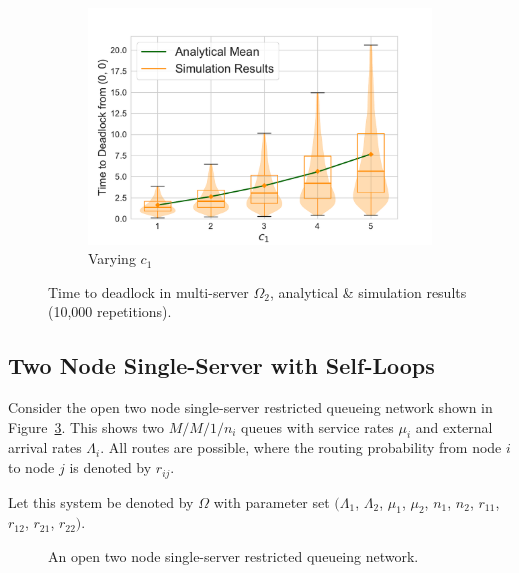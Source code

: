 \documentclass{article}
\numberwithin{equation}{section}
\begin{document}
\begin{figure}[!htbp]
\begin{center}
\begin{subfigure}[b]{0.48\textwidth}
    \includegraphics[width=\textwidth]{images/2Nms_varyc1}
    \caption{Varying $c_1$}
    \label{fig:2Nms_c}
  \end{subfigure}
  \end{center}
  \caption{Time to deadlock in multi-server $\Omega_2$, analytical \&
  simulation results (10,000 repetitions).}
  \label{fig:timestodeadlock2nodemultiserver}
\end{figure}


\subsection{Two Node Single-Server with Self-Loops}\label{sec:2nodeselfloops}

Consider the open two node single-server restricted queueing network shown in
Figure~\ref{fig:queueingnetwork_2nodesfeedback}.
This shows two \(M/M/1/n_i\) queues with service rates $\mu_i$  and external
arrival rates $\Lambda_i$.
All routes are possible, where the routing probability from node $i$ to node
$j$ is denoted by $r_{ij}$.

Let this system be denoted by $\Omega$ with parameter set $(\Lambda_1$,
$\Lambda_2$, $\mu_1$, $\mu_2$, $n_1$, $n_2$, $r_{11}$, $r_{12}$, $r_{21}$,
$r_{22})$.

\begin{figure}[!htbp]
  \begin{center}
  
  \end{center}
  \caption{An open two node single-server restricted queueing network.}
  \label{fig:queueingnetwork_2nodesfeedback}
\end{figure}
\end{document}
